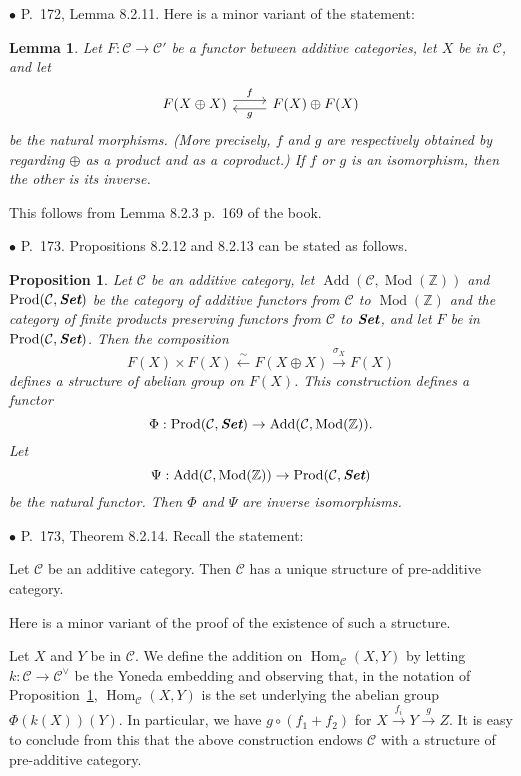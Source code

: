 \documentclass[12pt]{article}
\newtheorem{lem}[thm]{Lemma}
\newtheorem{prop}[thm]{Proposition}
\theoremstyle{remark}
\newcommand{\bu}{\bullet}
\newcommand{\n}{\noindent}
\newcommand{\C}{\mathcal C}
\newcommand{\xr}{\xrightarrow}
\newcommand{\pr}{Proposition}
\DeclareMathOperator{\h}{Hom}
\DeclareMathOperator{\Mod}{Mod}
\begin{document}

\n$\bu$ P.~172, Lemma 8.2.11. Here is a minor variant of the statement: 
%
\begin{lem}
Let $F:\C\to\C'$ be a functor between additive categories, let $X$ be in $\C$, and let 
$$
\begin{tikzcd}
F(X\oplus X)\ar[yshift=.7ex]{r}{f}&F(X)\oplus F(X)\ar[yshift=-.7ex]{l}{g}
\end{tikzcd}
$$ 
be the natural morphisms. (More precisely, $f$ and $g$ are respectively obtained by regarding $\oplus$ as a product and as a coproduct.) If $f$ or $g$ is an isomorphism, then the other is its inverse. 
\end{lem}
% 
This follows from Lemma 8.2.3 p.~169 of the book.\bigskip 


\n$\bu$ P.~173. \pr s 8.2.12 and 8.2.13 can be stated as follows. 
%
\begin{prop}\label{8212}
%
Let $\C$ be an additive category, let $\operatorname{Add}(\C,\Mod(\mathbb Z))$ and $\operatorname{Prod}(\C,\textbf{\em Set})$ be the category of additive functors from $\C$ to $\Mod(\mathbb Z)$ and the category of finite products preserving functors from $\C$ to $\textbf{\em Set}$, and let $F$ be in $\operatorname{Prod}(\C,\textbf{\em Set})$. Then the composition 
$$
F(X)\times F(X)\xleftarrow\sim F(X\oplus X)\xr{\sigma_X}F(X)
$$ 
defines a structure of abelian group on $F(X)$. This construction defines a functor 
$$
\Phi:\operatorname{Prod}(\C,\textbf{\em Set})\to\operatorname{Add}(\C,\Mod(\mathbb Z)).
$$ 
Let 
$$
\Psi:\operatorname{Add}(\C,\Mod(\mathbb Z))\to\operatorname{Prod}(\C,\textbf{\em Set})
$$ 
be the natural functor. Then $\Phi$ and $\Psi$ are inverse isomorphisms. 
%
\end{prop}

\n$\bu$ P.~173, Theorem 8.2.14. Recall the statement: 

Let $\C$ be an additive category. Then $\C$ has a unique structure of pre-additive category. 

Here is a minor variant of the proof of the existence of such a structure. 

Let $X$ and $Y$ be in $\C$. We define the addition on $\h_\C(X,Y)$ by letting $k:\C\to\C^\vee$ be the Yoneda embedding and observing that, in the notation of \pr\ \ref{8212}, $\h_\C(X,Y)$ is the set underlying the abelian group $\Phi(k(X))(Y)$. In particular, we have $g\circ(f_1+f_2)$ for $X\xr{f_i}Y\xr gZ$. It is easy to conclude from this that the above construction endows $\C$ with a structure of pre-additive category. 
\end{document}
